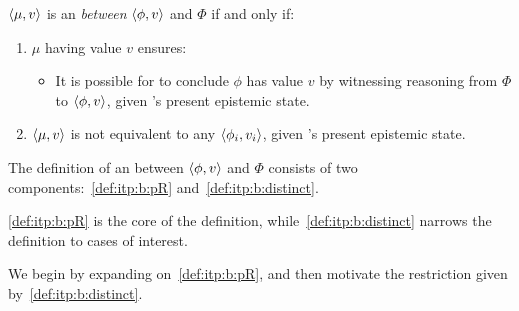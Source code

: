 \begin{note}
  \begin{definition}
    \label{def:itp:b}
    \(\langle \mu, v \rangle\) is an \itp{} \emph{between} \(\langle \phi, v \rangle\) and \(\Phi\) if and only if:

    \begin{enumerate}[label=\arabic*., ref=\named{\textsf{I.b}:\arabic*}]
    \item
      \label{def:itp:b:pR}
      \(\mu\) having value \(v\) ensures:
      \begin{itemize}
      \item
        It is possible for \vAgent{} to conclude \(\phi\) has value \(v\) by witnessing reasoning from \(\Phi\) to \(\langle \phi, v \rangle\), given \vAgent{}'s present epistemic state.
      \end{itemize}
    \item
      \label{def:itp:b:distinct}
      \(\langle \mu, v \rangle\) is not equivalent to any \(\langle \phi_{i}, v_{i} \rangle\), given \vAgent{}'s present epistemic state.
    \end{enumerate}
    \vspace{-\baselineskip}
  \end{definition}
\end{note}

\begin{note}[Plan]
  The definition of an \itp{} between \(\langle \phi, v \rangle\) and \(\Phi\) consists of two components:~\ref{def:itp:b:pR} and~\ref{def:itp:b:distinct}.

  \ref{def:itp:b:pR} is the core of the definition, while~\ref{def:itp:b:distinct} narrows the definition to cases of interest.

  We begin by expanding on~\ref{def:itp:b:pR}, and then motivate the restriction given by~\ref{def:itp:b:distinct}.
\end{note}

